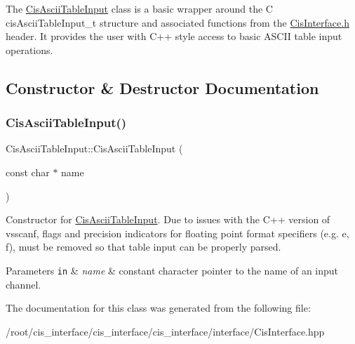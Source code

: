 The \mbox{\hyperlink{classCisAsciiTableInput}{Cis\+Ascii\+Table\+Input}} class is a basic wrapper around the C cis\+Ascii\+Table\+Input\+\_\+t structure and associated functions from the \mbox{\hyperlink{CisInterface_8h_source}{Cis\+Interface.\+h}} header. It provides the user with C++ style access to basic A\+S\+C\+II table input operations. 

\subsection{Constructor \& Destructor Documentation}
\mbox{\label{classCisAsciiTableInput_ae87bf636c04e42a7ab745eb164c52b41}} 
\subsubsection{\texorpdfstring{Cis\+Ascii\+Table\+Input()}{CisAsciiTableInput()}}
{\footnotesize\ttfamily Cis\+Ascii\+Table\+Input\+::\+Cis\+Ascii\+Table\+Input (\begin{DoxyParamCaption}\item[{const char $\ast$}]{name }\end{DoxyParamCaption})\hspace{0.3cm}{\ttfamily [inline]}}



Constructor for \mbox{\hyperlink{classCisAsciiTableInput}{Cis\+Ascii\+Table\+Input}}. Due to issues with the C++ version of vsscanf, flags and precision indicators for floating point format specifiers (e.\+g. e, f), must be removed so that table input can be properly parsed. 


\begin{DoxyParams}[1]{Parameters}
\mbox{\tt in}  & {\em name} & constant character pointer to the name of an input channel. \\
\hline
\end{DoxyParams}


The documentation for this class was generated from the following file\+:\begin{DoxyCompactItemize}
\item 
/root/cis\+\_\+interface/cis\+\_\+interface/cis\+\_\+interface/interface/Cis\+Interface.\+hpp\end{DoxyCompactItemize}
